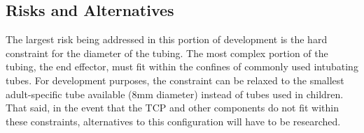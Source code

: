 \subsection{Risks and Alternatives}

The largest risk being addressed in this portion of development is the hard constraint for the diameter of the tubing. The most complex portion of the tubing, the end effector, must fit within the confines of commonly used intubating tubes. For development purposes, the constraint can be relaxed to the smallest adult-specific tube available (8mm diameter) instead of tubes used in children. That said, in the event that the TCP and other components do not fit within these constraints, alternatives to this configuration will have to be researched.

